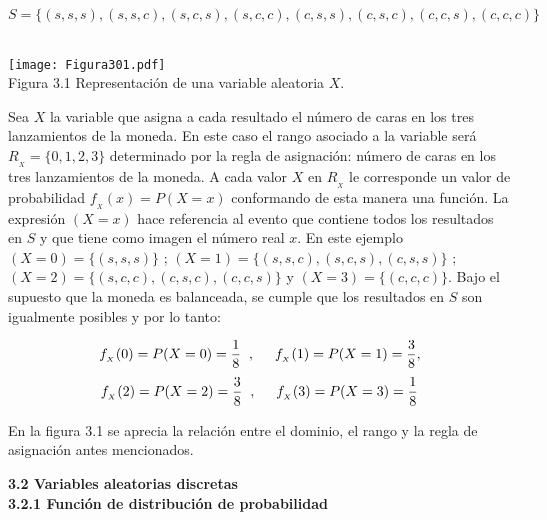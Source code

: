 \documentclass[base=hide,12pt]{elegantbook}
\begin{document}
$$S =\{(s,s,s),(s,s,c),(s,c,s),(s,c,c),(c,s,s),(c,s,c),(c,c,s),(c,c,c)\} $$\\
\begin{center}
\texttt{[image: Figura301.pdf]}\\
Figura 3.1 Representación de una variable aleatoria $X$.
\end{center}
\vspace{.5cm}

Sea $X$ la variable que asigna a cada resultado el número de caras en los tres lanzamientos de la moneda. En este caso el rango asociado a la variable será  $R_{_{X}}=\{0,1,2,3\}$ determinado por la regla de asignación: número de caras en los tres lanzamientos de la moneda.  A cada valor $X$ en $R_{_{X}}$ le corresponde un valor de probabilidad $f_{_{X}}(x)=P(X=x)$ conformando de esta  manera una  función. La expresión $(X=x)$ hace referencia al evento que contiene todos los resultados en $S$ y que tiene como imagen el número real $x$.  En este ejemplo $(X=0)=\{(s,s,s)\}$ ; $(X=1)=\{(s,s,c),(s,c,s),(c,s,s)\}$ ;  $(X=2)=\{(s,c,c),(c,s,c),(c,c,s) \} $ y $(X=3) =\{(c,c,c) \}$. Bajo el supuesto que la moneda es balanceada, se cumple que los resultados en $S$ son igualmente posibles y por lo tanto: 

$$f_{_{X}}(0) =P(X=0)= \frac{1}{8} \hspace{.2cm} ,\hspace{.5cm} f_{_{X}}(1) = P(X=1)=\frac{3}{8},$$
$$f_{_{X}}(2) = P(X=2)=\frac{3}{8}\hspace{.2cm} ,\hspace{.5cm} f_{_{X}}(3) =P(X=3)= \frac{1}{8}$$

En la figura 3.1  se aprecia la relación entre el dominio, el rango y la regla de asignación antes mencionados. 

\vspace{.5cm}
\textcolor{col4}{\large \bf 3.2 Variables aleatorias discretas}\\%

\vspace{.5cm}
\textcolor{col4}{\large \bf 3.2.1  Función de distribución de probabilidad}\\%
\vspace{.5cm}
\end{document}
